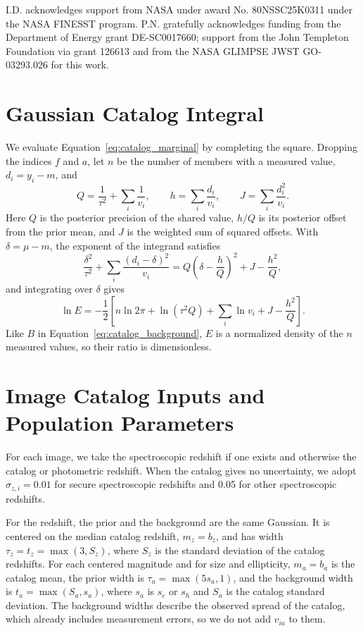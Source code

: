 \documentclass[twocolumn,twocolappendix,linenumbers]{aastex701}
\begin{document}
\begin{acknowledgments}
I.D. acknowledges support from NASA under award No. 80NSSC25K0311 under the NASA FINESST program.
P.N. gratefully acknowledges funding from the Department of Energy grant DE-SC0017660; support from the John Templeton Foundation via grant 126613 and from the NASA GLIMPSE JWST GO-03293.026 for this work.
\end{acknowledgments}

\appendix
\section{Gaussian Catalog Integral}
\label{app:gaussian}
We evaluate Equation~\ref{eq:catalog_marginal} by completing the square.
Dropping the indices $f$ and $a$, let $n$ be the number of members with a measured value, $d_i=y_i-m$, and
\begin{equation*}
Q=\frac{1}{\tau^2}+\sum_i\frac{1}{v_i},\qquad
h=\sum_i\frac{d_i}{v_i},\qquad
J=\sum_i\frac{d_i^2}{v_i}.
\end{equation*}
Here $Q$ is the posterior precision of the shared value, $h/Q$ is its posterior offset from the prior mean, and $J$ is the weighted sum of squared offsets.
With $\delta=\mu-m$, the exponent of the integrand satisfies
\begin{equation*}
\frac{\delta^2}{\tau^2}+\sum_i\frac{(d_i-\delta)^2}{v_i}=Q\left(\delta-\frac{h}{Q}\right)^2+J-\frac{h^2}{Q},
\end{equation*}
and integrating over $\delta$ gives
\begin{equation}
\ln E=-\frac12\left[n\ln2\pi+\ln(\tau^2Q)+\sum_i\ln v_i+J-\frac{h^2}{Q}\right].
\label{eq:gauss_closed}
\end{equation}
Like $B$ in Equation~\ref{eq:catalog_background}, $E$ is a normalized density of the $n$ measured values, so their ratio is dimensionless.

\section{Image Catalog Inputs and Population Parameters}
\label{app:catalog}
For each image, we take the spectroscopic redshift if one exists and otherwise the catalog or photometric redshift.
When the catalog gives no uncertainty, we adopt $\sigma_{z,i}=0.01$ for secure spectroscopic redshifts and 0.05 for other spectroscopic redshifts.

For the redshift, the prior and the background are the same Gaussian.
It is centered on the median catalog redshift, $m_z=b_z$, and has width $\tau_z=t_z=\max(3,S_z)$, where $S_z$ is the standard deviation of the catalog redshifts.
For each centered magnitude and for size and ellipticity, $m_a=b_a$ is the catalog mean, the prior width is $\tau_a=\max(5s_a,1)$, and the background width is $t_a=\max(S_a,s_a)$, where $s_a$ is $s_c$ or $s_h$ and $S_a$ is the catalog standard deviation.
The background widths describe the observed spread of the catalog, which already includes measurement errors, so we do not add $v_{ia}$ to them.
\end{document}
